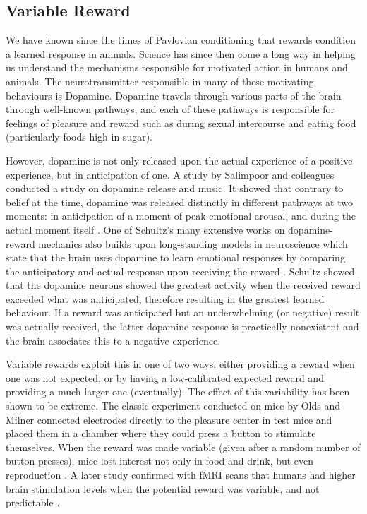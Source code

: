 \subsection{Variable Reward}
We have known since the times of Pavlovian conditioning that rewards condition a learned response in animals. Science has since then come a long way in helping us understand the mechanisms responsible for motivated action in humans and animals. The neurotransmitter responsible in many of these motivating behaviours is Dopamine. Dopamine travels through various parts of the brain through well-known pathways, and each of these pathways is responsible for feelings of pleasure and reward such as during sexual intercourse and eating food (particularly foods high in sugar).

However, dopamine is not only released upon the actual experience of a positive experience, but in anticipation of one. A study by Salimpoor and colleagues conducted a study on dopamine release and music. It showed that contrary to belief at the time, dopamine was released distinctly in different pathways at two moments: in anticipation of a moment of peak emotional arousal, and during the actual moment itself \cite{salimpoor2011anatomically}. One of Schultz's many extensive works on dopamine-reward mechanics also builds upon long-standing models in neuroscience which state that the brain uses dopamine to learn emotional responses by comparing the anticipatory and actual response upon receiving the reward \cite{schultz2016dopamine}. Schultz showed that the dopamine neurons showed the greatest activity when the received reward exceeded what was anticipated, therefore resulting in the greatest learned behaviour. If a reward was anticipated but an underwhelming (or negative) result was actually received, the latter dopamine response is practically nonexistent and the brain associates this to a negative experience.

Variable rewards exploit this in one of two ways: either providing a reward when one was not expected, or by having a low-calibrated expected reward and providing a much larger one (eventually). The effect of this variability has been shown to be extreme. The classic experiment conducted on mice by Olds and Milner connected electrodes directly to the pleasure center in test mice and placed them in a chamber where they could press a button to stimulate themselves. When the reward was made variable (given after a random number of button presses), mice lost interest not only in food and drink, but even reproduction \cite{olds1954positive}. A later study confirmed with fMRI scans that humans had higher brain stimulation levels when the potential reward was variable, and not predictable \cite{berns2001predictability}.

